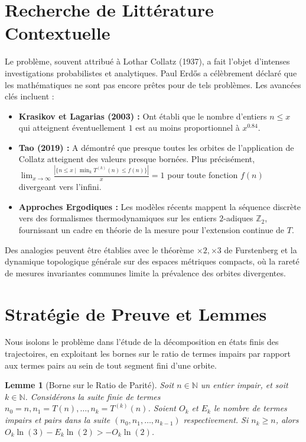 \documentclass[12pt,a4paper]{article}
\newtheorem{lemma}{Lemme}
\begin{document}
\section{Recherche de Litt\'erature Contextuelle}

Le probl\`eme, souvent attribu\'e \`a Lothar Collatz (1937), a fait l'objet d'intenses investigations probabilistes et analytiques. Paul Erd\H{o}s a c\'el\`ebrement d\'eclar\'e que les math\'ematiques ne sont pas encore pr\^etes pour de tels probl\`emes. Les avanc\'ees cl\'es incluent :

\begin{itemize}
    \item \textbf{Krasikov et Lagarias (2003) :} Ont \'etabli que le nombre d'entiers $n \leq x$ qui atteignent \'eventuellement $1$ est au moins proportionnel \`a $x^{0.84}$.
    \item \textbf{Tao (2019) :} A d\'emontr\'e que presque toutes les orbites de l'application de Collatz atteignent des valeurs presque born\'ees. Plus pr\'ecis\'ement, $\lim_{x \to \infty} \frac{|\{n \leq x \mid \min_{k} T^{(k)}(n) \leq f(n) \}|}{x} = 1$ pour toute fonction $f(n)$ divergeant vers l'infini.
    \item \textbf{Approches Ergodiques :} Les mod\`eles r\'ecents mappent la s\'equence discr\`ete vers des formalismes thermodynamiques sur les entiers $2$-adiques $\mathbb{Z}_2$, fournissant un cadre en th\'eorie de la mesure pour l'extension continue de $T$.
\end{itemize}

Des analogies peuvent \^etre \'etablies avec le th\'eor\`eme $\times 2, \times 3$ de Furstenberg et la dynamique topologique g\'en\'erale sur des espaces m\'etriques compacts, o\`u la raret\'e de mesures invariantes communes limite la pr\'evalence des orbites divergentes.

\section{Strat\'egie de Preuve et Lemmes}

Nous isolons le probl\`eme dans l'\'etude de la d\'ecomposition en \'etats finis des trajectoires, en exploitant les bornes sur le ratio de termes impairs par rapport aux termes pairs au sein de tout segment fini d'une orbite.

\begin{lemma}[Borne sur le Ratio de Parit\'e]
Soit $n \in \mathbb{N}$ un entier impair, et soit $k \in \mathbb{N}$. Consid\'erons la suite finie de termes $n_0 = n, n_1 = T(n), \ldots, n_k = T^{(k)}(n)$. Soient $O_k$ et $E_k$ le nombre de termes impairs et pairs dans la suite $(n_0, n_1, \ldots, n_{k-1})$ respectivement. Si $n_k \geq n$, alors $O_k \ln(3) - E_k \ln(2) > - O_k \ln(2)$.
\end{lemma}
\end{document}
